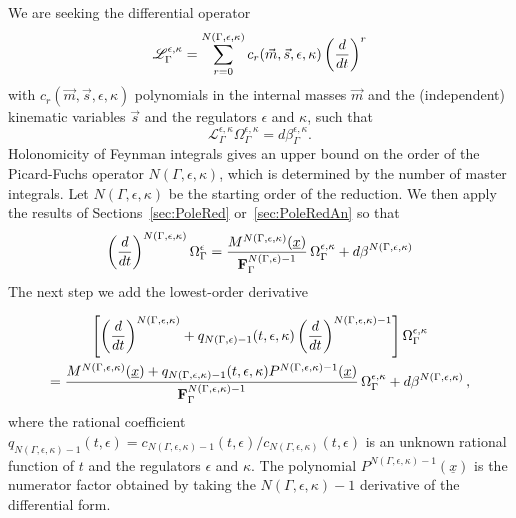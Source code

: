\documentclass[a4paper,12pt]{article}
\numberwithin{equation}{section}
\numberwithin{figure}{section}
\begin{document}
We are seeking the differential operator 
\begin{equation}\label{e:PFgeneric}
  \mathscr{L}_\Gamma^{\epsilon,\kappa}=\sum_{r=0}^{N(\Gamma,\epsilon,\kappa)}
  c_r(\vec m,\vec s,\epsilon,\kappa) \left(d\over dt\right)^r
\end{equation}
with $c_r(\vec m,\vec s,\epsilon,\kappa)$ polynomials in the internal masses
$\vec m$  and the (independent) kinematic variables $\vec s$  and the
regulators $\epsilon$  and $\kappa$, such that
\begin{equation}
     \mathscr{L}_\Gamma^{\epsilon,\kappa} \Omega_\Gamma^{\epsilon,\kappa}= d\beta^{\epsilon,\kappa}_\Gamma.
   \end{equation}
%
Holonomicity of Feynman integrals gives an upper bound on the order of the Picard-Fuchs operator $N(\Gamma,\epsilon,\kappa)$, which is  determined by
 the number of master
integrals. Let $N(\Gamma,\epsilon,\kappa)$  be the starting order of the
reduction.  We then apply the results of Sections~\ref{sec:PoleRed}
or~\ref{sec:PoleRedAn} so that
%
\begin{equation}\label{e:step1}
\left(d\over dt\right)^{N(\Gamma,\epsilon,\kappa)} \Omega_\Gamma^\epsilon= {M^{
      N(\Gamma,\epsilon,\kappa)}(\underline x)\over
    \textbf{F}_\Gamma^{N(\Gamma,\epsilon)-1}
  } \,\Omega_\Gamma^{\epsilon,\kappa}+ d\beta^{N(\Gamma,\epsilon,\kappa)}  
\end{equation}
%
The next step we add the lowest-order derivative

\begin{multline}\label{e:step2}
\left[\left(d\over dt\right)^{N(\Gamma,\epsilon,\kappa)}
  +q_{N(\Gamma,\epsilon)-1}(t,\epsilon,\kappa) \left(d\over dt\right)^{N(\Gamma,\epsilon,\kappa)-1}\right] \Omega_\Gamma^{\epsilon,\kappa}\cr= {M^{
      N(\Gamma,\epsilon,\kappa)}(\underline x)+q_{N(\Gamma,\epsilon,\kappa)-1}(t,\epsilon,\kappa)
    P^{N(\Gamma,\epsilon,\kappa)-1}(\underline x) \over
    \textbf{F}_\Gamma^{N(\Gamma,\epsilon,\kappa)-1}
  }\,\Omega_\Gamma^{\epsilon,\kappa}+ d\beta^{N(\Gamma,\epsilon,\kappa)}\, ,  
\end{multline}
where the rational coefficient
$q_{N(\Gamma,\epsilon,\kappa)-1}(t,\epsilon)=c_{N(\Gamma,\epsilon,\kappa)-1}(t,\epsilon)/c_{N(\Gamma,\epsilon,\kappa)}(t,\epsilon)$
is an unknown rational function of $t$ and  the regulators $\epsilon$
and $\kappa$. 
The polynomial $ P^{N(\Gamma,\epsilon,\kappa)-1}(\underline x) $
is the numerator factor obtained by taking the $N(\Gamma,\epsilon,\kappa)-1$
derivative of the differential form.
\end{document}
